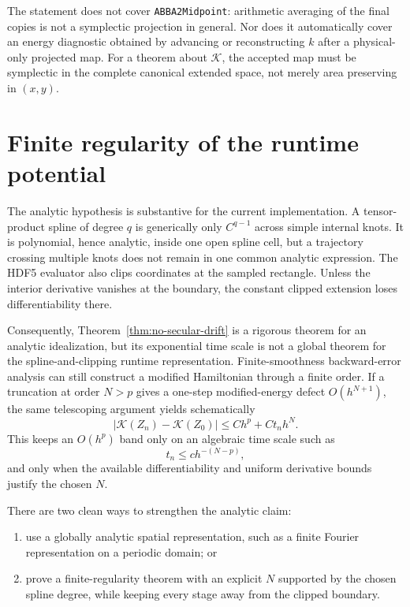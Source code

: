 \documentclass[11pt,a4paper]{article}
\theoremstyle{definition}
\theoremstyle{remark}
\newcommand{\K}{\mathcal{K}}
\newcommand{\abs}[1]{\left\lvert #1\right\rvert}
\begin{document}
The statement does not cover \texttt{ABBA2Midpoint}: arithmetic averaging of
the final copies is not a symplectic projection in general.  Nor does it
automatically cover an energy diagnostic obtained by advancing or
reconstructing $k$ after a physical-only projected map.  For a theorem about
$\K$, the accepted map must be symplectic in the complete canonical extended
space, not merely area preserving in $(x,y)$.

\section{Finite regularity of the runtime potential}

The analytic hypothesis is substantive for the current implementation.
A tensor-product spline of degree $q$ is generically only $C^{q-1}$ across
simple internal knots.  It is polynomial, hence analytic, inside one open
spline cell, but a trajectory crossing multiple knots does not remain in one
common analytic expression.  The HDF5 evaluator also clips coordinates at the
sampled rectangle.  Unless the interior derivative vanishes at the boundary,
the constant clipped extension loses differentiability there.

Consequently, Theorem~\ref{thm:no-secular-drift} is a rigorous theorem for an
analytic idealization, but its exponential time scale is not a global theorem
for the spline-and-clipping runtime representation.  Finite-smoothness
backward-error analysis can still construct a modified Hamiltonian through a
finite order.  If a truncation at order $N>p$ gives a one-step modified-energy
defect $O(h^{N+1})$, the same telescoping argument yields schematically
\begin{equation}
 \abs{\K(Z_n)-\K(Z_0)}
 \leq Ch^p+C t_nh^N.
 \label{eq:finite-smoothness-energy-bound}
\end{equation}
This keeps an $O(h^p)$ band only on an algebraic time scale such as
\begin{equation}
 t_n\leq c h^{-(N-p)},
 \label{eq:algebraic-time-scale}
\end{equation}
and only when the available differentiability and uniform derivative bounds
justify the chosen $N$.

There are two clean ways to strengthen the analytic claim:
\begin{enumerate}
 \item use a globally analytic spatial representation, such as a finite
       Fourier representation on a periodic domain; or
 \item prove a finite-regularity theorem with an explicit $N$ supported by the
       chosen spline degree, while keeping every stage away from the clipped
       boundary.
\end{enumerate}
\end{document}

